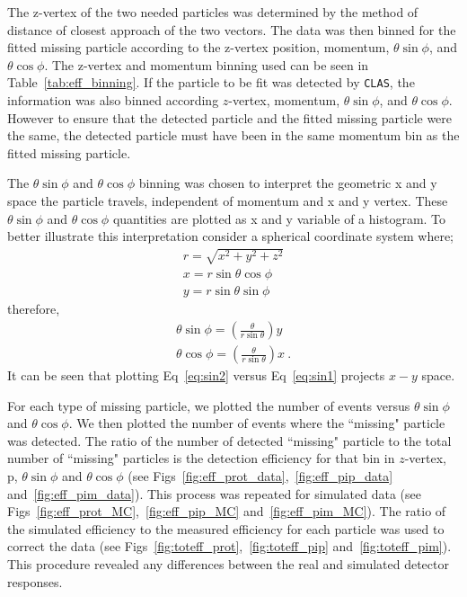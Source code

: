 \documentclass[11pt,a4paper]{article}
\newcommand{\abbr}[1]{\textsc{\texttt{#1}}}
\def\tables{/Users/michaelkunkel/WORK/GIT_HUB/Pi0_Papers/ANALYSIS_NOTE/tables}
\begin{document}
The z-vertex of the two needed particles was determined by the method of distance of closest approach of the two vectors. The data was then binned for the fitted missing particle according to the z-vertex position, momentum, $\theta \sin\phi$, and $\theta \cos\phi$. The z-vertex and momentum binning used can be seen in Table~\ref{tab:eff_binning}. If the particle to be fit was detected by \abbr{CLAS}, the information was also binned according $z$-vertex, momentum, $\theta \sin\phi$, and $\theta \cos\phi$. However to ensure that the detected particle and the fitted missing particle were the same, the detected particle must have been in the same momentum bin as the fitted missing particle.

The $\theta \sin\phi$ and $\theta \cos\phi$ binning was chosen to interpret the geometric x and y space the particle travels, independent of momentum and x and y vertex. These $\theta \sin\phi$ and $\theta \cos\phi$ quantities are plotted as x and y variable of a histogram. To better illustrate this interpretation consider a spherical coordinate system where;
\begin{align}
  r=\sqrt{x^2 + y^2 + z^2} \\
  x = r\sin\theta\cos\phi  \\
  y = r\sin\theta\sin\phi
\end{align}
therefore,
\begin{align}
  \theta \sin\phi = \left(\frac{\theta}{r\sin\theta}\right)y \label{eq:sin1}     \\
  \theta \cos\phi = \left(\frac{\theta}{r\sin\theta}\right)x \label{eq:sin2} \ .
\end{align}
It can be seen that plotting Eq~\ref{eq:sin2} versus Eq~\ref{eq:sin1} projects $x-y$ space.

For each type of missing particle, we plotted the number of events versus $\theta \sin\phi$ and $\theta \cos\phi$. We then plotted the number of events where the ``missing" particle was detected. The ratio of the number of detected ``missing" particle to the total number of ``missing" particles is the detection efficiency for that bin in $z$-vertex, p, $\theta \sin\phi$ and $\theta \cos\phi$ (see Figs~\ref{fig:eff_prot_data},~\ref{fig:eff_pip_data} and~\ref{fig:eff_pim_data}). This process was repeated for simulated data (see Figs~\ref{fig:eff_prot_MC},~\ref{fig:eff_pip_MC} and~\ref{fig:eff_pim_MC}). The ratio of the simulated efficiency to the measured efficiency for each particle was used to correct the data (see Figs~\ref{fig:toteff_prot},~\ref{fig:toteff_pip} and~\ref{fig:toteff_pim}). This procedure revealed any differences between the real and simulated detector responses.
\FloatBarrier
\end{document}

